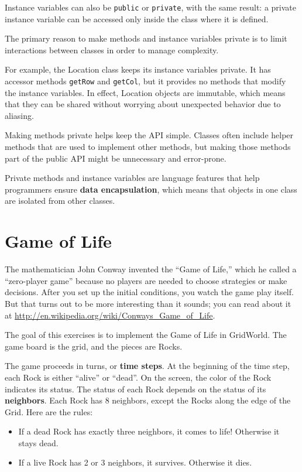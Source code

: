 \documentclass[12pt]{book}
\theoremstyle{exercise}
\begin{document}
Instance variables can also be {\tt public} or {\tt private}, with
the same result: a private instance variable can be accessed only
inside the class where it is defined.

The primary reason to make methods and instance variables private
is to limit interactions between classes in order to manage
complexity.

For example, the Location class keeps its instance variables private.
It has accessor methods {\tt getRow} and {\tt getCol}, but it provides
no methods that modify the instance variables.  In effect, Location
objects are immutable, which means that they can be shared without
worrying about unexpected behavior due to aliasing.

Making methods private helps keep the API simple.  Classes often
include helper methods that are used to implement other methods, but
making those methods part of the public API might be unnecessary
and error-prone.

Private methods and instance variables are language features
that help programmers ensure {\bf data encapsulation}, which means
that objects in one class are isolated from other classes.


\section{Game of Life}

The mathematician John Conway invented
the ``Game of Life,'' which he called a ``zero-player game''
because no players are needed to choose strategies or make decisions.
After you set up the initial conditions, you watch the game
play itself.  But that turns out to be more interesting than it sounds;
you can read about it at
\url{http://en.wikipedia.org/wiki/Conways_Game_of_Life}.

The goal of this exercises is to implement the Game of Life in
GridWorld.  The game board is the grid, and the pieces are Rocks.

The game proceeds in turns, or {\bf time steps}.  At the beginning
of the time step, each Rock is either ``alive'' or ``dead''.  On the
screen, the color of the Rock indicates its status.
%
The status of each Rock depends on the status of its
{\bf neighbors}.  Each Rock has 8 neighbors, except the Rocks along
the edge of the Grid.  Here are the rules:

\begin{itemize}

\item If a dead Rock has exactly three neighbors, it comes to life!
Otherwise it stays dead.

\item If a live Rock has 2 or 3 neighbors, it survives.  Otherwise it dies.

\end{itemize}
\end{document}
